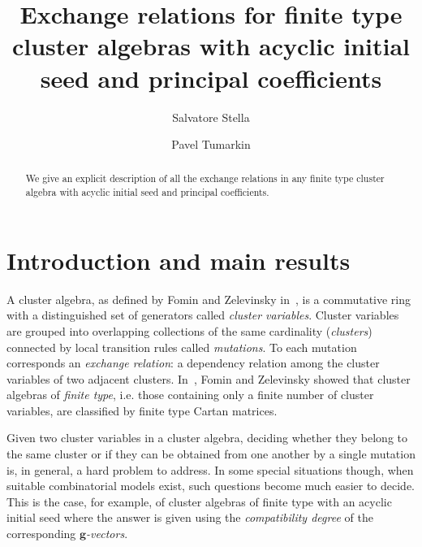 \documentclass[11pt]{amsart}
\newcommand{\bg}{\mathbf{g}}
\theoremstyle{definition}
\numberwithin{equation}{section}
\numberwithin{figure}{section}
\begin{document}
\title[Exchange relations for finite type cluster algebras]{Exchange relations for finite type cluster algebras with acyclic initial seed and principal coefficients}

\author[Stella]{Salvatore Stella}
\address[Salvatore Stella]{IN$d$AM - Marie Curie Actions fellow, Universit\`a ``La Sapienza'', Roma, Italy.}

\author[tumarkin]{Pavel Tumarkin}
\address[Pavel Tumarkin]{Department of Mathematical Sciences, Durham University, UK}

\begin{abstract}
We give an explicit description of all the exchange relations in any finite type cluster algebra with acyclic initial seed and principal coefficients.
\end{abstract}

\maketitle

\section{Introduction and main results}
  A cluster algebra, as defined by Fomin and Zelevinsky in~\cite{FZ02}, is a commutative ring with a distinguished set of generators called \emph{cluster variables}.
  Cluster variables are grouped into overlapping collections of the same cardinality (\emph{clusters}) connected by local transition rules called \emph{mutations}.
  To each mutation corresponds an \emph{exchange relation}: a dependency relation among the cluster variables of two adjacent clusters.
  In~\cite{FZ03}, Fomin and Zelevinsky showed that cluster algebras of \emph{finite type}, i.e. those containing only a finite number of cluster variables, are classified by finite type Cartan matrices.

  Given two cluster variables in a cluster algebra, deciding whether they belong to the same cluster or if they can be obtained from one another by a single mutation is, in general, a hard problem to address.
  In some special situations though, when suitable combinatorial models exist, such questions become much easier to decide.
  This is the case, for example, of cluster algebras of finite type with an acyclic initial seed where the answer is given using the \emph{compatibility degree} of the corresponding \emph{$\bg$-vectors}.
\end{document}
